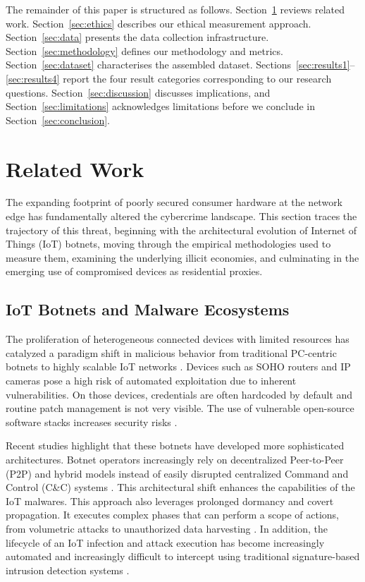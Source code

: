 \documentclass[journal]{IEEEtran}
\begin{document}
The remainder of this paper is structured as follows.
Section~\ref{sec:related_work} reviews related work.
Section~\ref{sec:ethics} describes our ethical measurement approach.
Section~\ref{sec:data} presents the data collection infrastructure.
Section~\ref{sec:methodology} defines our methodology and metrics.
Section~\ref{sec:dataset} characterises the assembled dataset.
Sections~\ref{sec:results1}--\ref{sec:results4} report the four result
categories corresponding to our research questions.
Section~\ref{sec:discussion} discusses implications, and
Section~\ref{sec:limitations} acknowledges limitations before we conclude
in Section~\ref{sec:conclusion}.

\section{Related Work}
\label{sec:related_work}

The expanding footprint of poorly secured consumer hardware at the network edge has fundamentally altered the cybercrime landscape. This section traces the trajectory of this threat, beginning with the architectural evolution of Internet of Things (IoT) botnets, moving through the empirical methodologies used to measure them, examining the underlying illicit economies, and culminating in the emerging use of compromised devices as residential proxies.

\subsection{IoT Botnets and Malware Ecosystems}

The proliferation of heterogeneous connected devices with limited resources has catalyzed a paradigm shift in malicious behavior from traditional PC-centric botnets to highly scalable IoT networks \cite{happy2025inside}. Devices such as SOHO routers and IP cameras pose a high risk of automated exploitation due to inherent vulnerabilities. On those devices, credentials are often hardcoded by default and routine patch management is not very visible. The use of vulnerable open-source software stacks increases security risks \cite{siwakoti2023advances}.

Recent studies highlight that these botnets have developed more sophisticated architectures. Botnet operators increasingly rely on decentralized Peer-to-Peer (P2P) and hybrid models instead of easily disrupted centralized Command and Control (C\&C) systems \cite{happy2025inside}. This architectural shift enhances the capabilities of the IoT malwares. This approach also leverages prolonged dormancy and covert propagation. It executes complex phases that can perform a scope of actions, from volumetric attacks to unauthorized data harvesting \cite{garg2025iot}. In addition, the lifecycle of an IoT infection and attack execution has become increasingly automated and increasingly difficult to intercept using traditional signature-based intrusion detection systems \cite{happy2025inside}.
\end{document}

